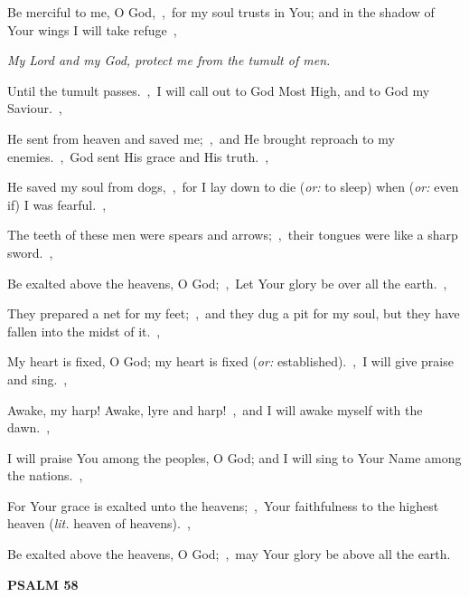 \documentclass[12pt,twoside,a5paper]{article}
\newcommand{\psalm}[1]{\textbf{PSALM {#1}}\nopagebreak}
\newcommand{\qanona}[1]{{\liturgicalhint{Qanona.} \emph{#1}}}
\newcommand{\translationoption}[1]{\emph{or:} #1}
\newcommand{\translationliteral}[1]{\emph{lit.} #1}
\begin{document}
\begin{normalparskip}
  Be merciful to me, O God,~\sep\ for my soul trusts in You; and in the shadow of Your wings I will take refuge~\sep

  \qanona{My Lord and my God, protect me from the tumult of men.}

  Until the tumult passes.~\sep\ I will call out to God Most High, and to God my Saviour.~\sep

  He sent from heaven and saved me;~\sep\ and He brought reproach to my enemies.~\sep\ God sent His grace and His truth.~\sep

  He saved my soul from dogs,~\sep\ for I lay down to die (\translationoption{to sleep}) when (\translationoption{even if}) I was fearful.~\sep

  The teeth of these men were spears and arrows;~\sep\ their tongues were like a sharp sword.~\sep

  Be exalted above the heavens, O God;~\sep\ Let Your glory be over all the earth.~\sep

  They prepared a net for my feet;~\sep\ and they dug a pit for my soul, but they have fallen into the midst of it.~\sep

  My heart is fixed, O God; my heart is fixed (\translationoption{established}).~\sep\ I will give praise and sing.~\sep

  Awake, my harp! Awake, lyre and harp!~\sep\ and I will awake myself with the dawn.~\sep

  I will praise You among the peoples, O God; and I will sing to Your Name among the nations.~\sep

  For Your grace is exalted unto the heavens;~\sep\ Your faithfulness to the highest heaven (\translationliteral{heaven of heavens}).~\sep

  Be exalted above the heavens, O God;~\sep\ may Your glory be above all the earth.
\end{normalparskip}

\psalm{58}
\end{document}
